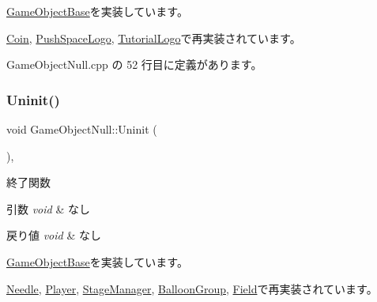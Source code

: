 \mbox{\hyperlink{class_game_object_base_a85c59554f734bcb09f1a1e18d9517dce}{Game\+Object\+Base}}を実装しています。



\mbox{\hyperlink{class_coin_a52c50229ce7c1e0f459e198adac70c8d}{Coin}}, \mbox{\hyperlink{class_push_space_logo_afa163b1aff8df494b4f09f378bf983f0}{Push\+Space\+Logo}}, \mbox{\hyperlink{class_tutorial_logo_a2c9e22c81cfeafbd34f50cc766a66cf1}{Tutorial\+Logo}}で再実装されています。



 Game\+Object\+Null.\+cpp の 52 行目に定義があります。

\mbox{\label{class_game_object_null_a1a70fbd3260fd1c0100320756830a0db}} 
\subsubsection{\texorpdfstring{Uninit()}{Uninit()}}
{\footnotesize\ttfamily void Game\+Object\+Null\+::\+Uninit (\begin{DoxyParamCaption}{ }\end{DoxyParamCaption})\hspace{0.3cm}{\ttfamily [override]}, {\ttfamily [virtual]}}



終了関数 


\begin{DoxyParams}{引数}
{\em void} & なし \\
\hline
\end{DoxyParams}

\begin{DoxyRetVals}{戻り値}
{\em void} & なし \\
\hline
\end{DoxyRetVals}


\mbox{\hyperlink{class_game_object_base_a804828a399b4f76bb8c8a8d6727ebd97}{Game\+Object\+Base}}を実装しています。



\mbox{\hyperlink{class_needle_a077c40beda665b249522349df0f16da1}{Needle}}, \mbox{\hyperlink{class_player_a7455a83ac23d2f5e0cce0ddd7d92db0c}{Player}}, \mbox{\hyperlink{class_stage_manager_ab36f48dee34ce481c585b1d96df26dce}{Stage\+Manager}}, \mbox{\hyperlink{class_balloon_group_a12ade72ec1cbb2a1afe431c471bbc255}{Balloon\+Group}}, \mbox{\hyperlink{class_field_a6d1015e2409daa87cd00485ac1efc06b}{Field}}で再実装されています。



